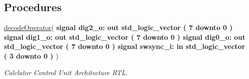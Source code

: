 \subsection*{Procedures}
 \begin{DoxyCompactItemize}
\item 
{\bfseries {\bfseries \textcolor{vhdlchar}{ }}} \hyperlink{classcalc__ctrl_1_1rtl_a3cfaac6a4338f4e7cb72b3cc357f8f13}{decode\+Operator}( \newline
{\bfseries \textcolor{keywordflow}{signal }\textcolor{vhdlchar}{dig2\+\_\+o\+: }\textcolor{stringliteral}{} {\bfseries \textcolor{keywordflow}{out}\textcolor{vhdlchar}{ }\textcolor{comment}{std\+\_\+logic\+\_\+vector}\textcolor{vhdlchar}{ }\textcolor{vhdlchar}{(}\textcolor{vhdlchar}{ }\textcolor{vhdlchar}{ } \textcolor{vhdldigit}{7} \textcolor{vhdlchar}{ }\textcolor{keywordflow}{downto}\textcolor{vhdlchar}{ }\textcolor{vhdlchar}{ } \textcolor{vhdldigit}{0} \textcolor{vhdlchar}{ }\textcolor{vhdlchar}{)}\textcolor{vhdlchar}{ }}}\newline
  {\bfseries \textcolor{keywordflow}{signal }\textcolor{vhdlchar}{dig1\+\_\+o\+: }\textcolor{stringliteral}{} {\bfseries \textcolor{keywordflow}{out}\textcolor{vhdlchar}{ }\textcolor{comment}{std\+\_\+logic\+\_\+vector}\textcolor{vhdlchar}{ }\textcolor{vhdlchar}{(}\textcolor{vhdlchar}{ }\textcolor{vhdlchar}{ } \textcolor{vhdldigit}{7} \textcolor{vhdlchar}{ }\textcolor{keywordflow}{downto}\textcolor{vhdlchar}{ }\textcolor{vhdlchar}{ } \textcolor{vhdldigit}{0} \textcolor{vhdlchar}{ }\textcolor{vhdlchar}{)}\textcolor{vhdlchar}{ }}}\newline
  {\bfseries \textcolor{keywordflow}{signal }\textcolor{vhdlchar}{dig0\+\_\+o\+: }\textcolor{stringliteral}{} {\bfseries \textcolor{keywordflow}{out}\textcolor{vhdlchar}{ }\textcolor{comment}{std\+\_\+logic\+\_\+vector}\textcolor{vhdlchar}{ }\textcolor{vhdlchar}{(}\textcolor{vhdlchar}{ }\textcolor{vhdlchar}{ } \textcolor{vhdldigit}{7} \textcolor{vhdlchar}{ }\textcolor{keywordflow}{downto}\textcolor{vhdlchar}{ }\textcolor{vhdlchar}{ } \textcolor{vhdldigit}{0} \textcolor{vhdlchar}{ }\textcolor{vhdlchar}{)}\textcolor{vhdlchar}{ }}}\newline
  {\bfseries \textcolor{keywordflow}{signal }\textcolor{vhdlchar}{swsync\+\_\+i\+: }\textcolor{stringliteral}{} {\bfseries \textcolor{keywordflow}{in}\textcolor{vhdlchar}{ }\textcolor{comment}{std\+\_\+logic\+\_\+vector}\textcolor{vhdlchar}{ }\textcolor{vhdlchar}{(}\textcolor{vhdlchar}{ }\textcolor{vhdlchar}{ } \textcolor{vhdldigit}{3} \textcolor{vhdlchar}{ }\textcolor{keywordflow}{downto}\textcolor{vhdlchar}{ }\textcolor{vhdlchar}{ } \textcolor{vhdldigit}{0} \textcolor{vhdlchar}{ }\textcolor{vhdlchar}{)}\textcolor{vhdlchar}{ }}}\newline
   )
\begin{DoxyCompactList}\small\item\em Calclator Control Unit Architecture R\+TL. \end{DoxyCompactList}\end{DoxyCompactItemize}
